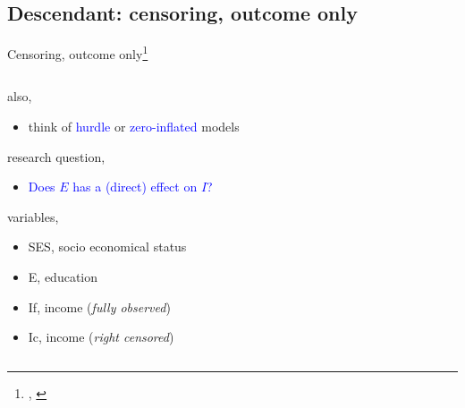 \subsection{Descendant: censoring, outcome only}
%
%
\begin{frame}[t, negative]
	\subsectionpage
\end{frame}
%
%	
\begin{frame}
	{Censoring, outcome only\footnote{\citet{Ostling_2022}, \citet{Vincent_2022} }}
	\begin{columns}
		\begin{column}{0.5\textwidth}
			also, 
			\begin{itemize}
				\item think of \textcolor{blue}{hurdle} or \textcolor{blue}{zero-inflated} models
			\end{itemize}
			
			research question, 
			\begin{itemize}
				\item \textcolor{blue}{Does $E$ has a (direct) effect on $I$?}
			\end{itemize}
			
			variables,
			\begin{itemize}
				\item SES, socio economical status
				\item E, education
				\item If, income (\textit{fully observed})
				\item Ic, income (\textit{right censored})
			\end{itemize}
			

\end{column}
\end{columns}
\end{frame}
